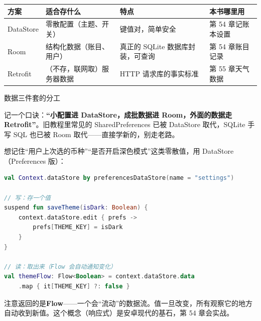 


\begin{center}
\begin{tabularx}{\linewidth}{|X|X|X|X|}
\hline
\textbf{方案} & \textbf{适合存什么} & \textbf{特点} & \textbf{本书哪里用} \tabularnewline
\hline
DataStore & 零散配置（主题、开关） & 键值对，简单安全 & 第 54 章记账本设置 \tabularnewline
Room & 结构化数据（账目、用户） & 真正的 SQLite 数据库封装，可查询 & 第 54 章账目记录 \tabularnewline
Retrofit & （不存，联网取）服务器数据 & HTTP 请求库的事实标准 & 第 55 章天气数据 \tabularnewline
\hline
\end{tabularx}
\end{center}

\begin{center}\small\color{gray}数据三件套的分工\end{center}

记一个口诀：\textbf{“小配置进 DataStore，成批数据进 Room，外面的数据走 Retrofit”}。旧教程里常见的 SharedPreferences 已被 DataStore 取代，SQLite 手写 SQL 也已被 Room 取代——直接学新的，别走老路。


想记住“用户上次选的币种”“是否开启深色模式”这类零散值，用 DataStore（Preferences 版）：

\begin{lstlisting}[language=Kotlin]
val Context.dataStore by preferencesDataStore(name = "settings")

// 写：存一个值
suspend fun saveTheme(isDark: Boolean) {
    context.dataStore.edit { prefs ->
        prefs[THEME_KEY] = isDark
    }
}

// 读：取出来（Flow 会自动通知变化）
val themeFlow: Flow<Boolean> = context.dataStore.data
    .map { it[THEME_KEY] ?: false }
\end{lstlisting}

注意返回的是\textbf{Flow}——一个会“流动”的数据流。值一旦改变，所有观察它的地方自动收到新值。这个概念（响应式）是安卓现代的基石，第 54 章会实战。


